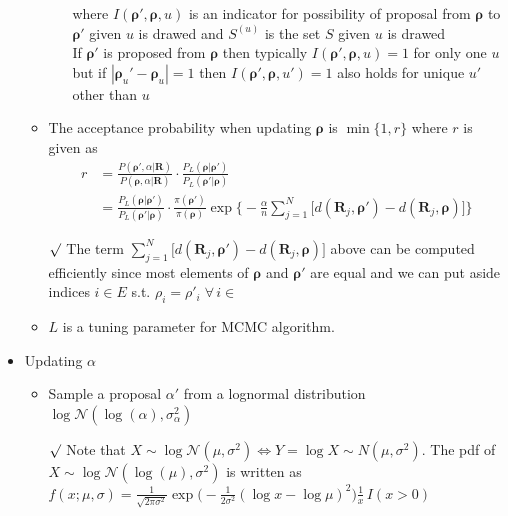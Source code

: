 \documentclass[12pt]{article}
\newcommand{\rmk}{$\surd$}
\begin{document}
\begin{itemize}
\begin{itemize}
\begin{itemize}
            where $I(\boldsymbol{\rho}', \boldsymbol{\rho}, u)$ is an indicator for possibility of proposal from $\boldsymbol{\rho}$ to $\boldsymbol{\rho}'$ given $u$ is drawed and $S^{(u)}$ is the set $S$ given $u$ is drawed \\ If $\boldsymbol{\rho}'$ is proposed from $\boldsymbol{\rho}$ then typically $I(\boldsymbol{\rho}', \boldsymbol{\rho}, u)=1$ for only one $u$ but if $|\boldsymbol{\rho}_u'-\boldsymbol{\rho}_u|=1$ then $I(\boldsymbol{\rho}', \boldsymbol{\rho}, u')=1$ also holds for unique $u'$ other than $u$ 
        \end{itemize} 
        \item The acceptance probability when updating $\boldsymbol{\rho}$ is 
        $\min\{1, r\}$ where $r$ is given as 
        \begin{align*}
            r &=\frac{P(\boldsymbol{\rho}', \alpha | \mathbf{R})}{P(\boldsymbol{\rho}, \alpha | \mathbf{R})}\cdot \frac{P_L(\boldsymbol{\rho}|\boldsymbol{\rho}')}{P_L(\boldsymbol{\rho}'|\boldsymbol{\rho})} \\ &= \frac{P_L(\boldsymbol{\rho}|\boldsymbol{\rho}')}{P_L(\boldsymbol{\rho}'|\boldsymbol{\rho})} \cdot \frac{\pi(\boldsymbol{\rho}')}{\pi(\boldsymbol{\rho})}\exp\big\{-\frac{\alpha}{n}\sum_{j=1}^N \big[d(\mathbf{R}_j, \boldsymbol{\rho}')-d(\mathbf{R}_j, \boldsymbol{\rho})\big] \big\}
        \end{align*} 
        \item[\rmk] The term $\sum_{j=1}^N \big[d(\mathbf{R}_j, \boldsymbol{\rho}')-d(\mathbf{R}_j, \boldsymbol{\rho})\big]$ above can be computed efficiently since most elements of $\boldsymbol{\rho}$ and $\boldsymbol{\rho}'$ are equal and we can put aside indices $i\in E$ s.t. $\rho_i=\rho'_i \; \forall \, i\in$
        \item $L$ is a tuning parameter for MCMC algorithm.  
    \end{itemize}
    \item Updating $\alpha$
    \begin{itemize}
        \item Sample a proposal $\alpha '$ from a lognormal distribution $\log\mathcal{N}(\log(\alpha), \sigma_\alpha^2)$
        \item[\rmk]  Note that $X\sim \log\mathcal{N}(\mu, \sigma^2)\Leftrightarrow Y=\log X\sim N(\mu, \sigma^2)$. The pdf of $X\sim \log\mathcal{N}(\log(\mu), \sigma^2)$ is written as $f(x ; \mu, \sigma)=\frac{1}{\sqrt{2\pi \sigma^2}}\exp\bigl(-\frac{1}{2\sigma^2}(\log x -\log \mu)^2 \bigr)\frac{1}{x}\,I(x>0)$

\end{itemize}
\end{itemize}
\end{document}
